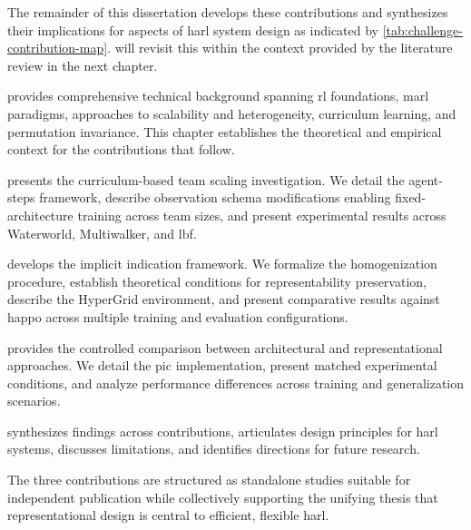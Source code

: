 The remainder of this dissertation develops these contributions 
and synthesizes their implications for aspects of \gls{harl} 
system design as indicated by \cref{tab:challenge-contribution-map}.
 will revisit this within the 
context provided by the literature review in the next chapter.

\textbf{} provides comprehensive 
technical background spanning \gls{rl} foundations, 
\gls{marl} paradigms, approaches to scalability and heterogeneity, 
curriculum learning, and permutation invariance. This chapter establishes 
the theoretical and empirical context for the contributions that follow.

\textbf{} presents the curriculum-based 
team scaling investigation. We detail the agent-steps framework, 
describe observation schema modifications enabling fixed-architecture 
training across team sizes, and present experimental results across 
Waterworld, Multiwalker, and \gls{lbf}.

\textbf{} develops the implicit indication framework. 
We formalize the homogenization procedure, establish theoretical conditions 
for representability preservation, describe the HyperGrid environment, 
and present comparative results against \gls{happo} across multiple 
training and evaluation configurations.

\textbf{} provides the controlled comparison 
between architectural and representational approaches. We detail the 
\gls{pic} implementation, present matched experimental conditions, 
and analyze performance differences across training and generalization scenarios.

\textbf{} synthesizes findings across contributions, 
articulates design principles for \gls{harl} systems, discusses limitations, 
and identifies directions for future research.

The three contributions are structured as standalone studies suitable 
for independent publication while collectively supporting the unifying 
thesis that representational design is central to efficient, flexible \gls{harl}. 

